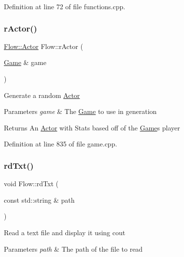 Definition at line 72 of file functions.\+cpp.

\hypertarget{namespace_flow_ad2921d35a512b47f3d231ae37f730e61}{}\label{namespace_flow_ad2921d35a512b47f3d231ae37f730e61} 
\subsubsection{\texorpdfstring{r\+Actor()}{rActor()}}
{\footnotesize\ttfamily \hyperlink{class_flow_1_1_actor}{Flow\+::\+Actor} Flow\+::r\+Actor (\begin{DoxyParamCaption}\item[{\hyperlink{class_flow_1_1_game}{Game} \&}]{game }\end{DoxyParamCaption})}

Generate a random \hyperlink{class_flow_1_1_actor}{Actor} 
\begin{DoxyParams}{Parameters}
{\em game} & The \hyperlink{class_flow_1_1_game}{Game} to use in generation \\
\hline
\end{DoxyParams}
\begin{DoxyReturn}{Returns}
An \hyperlink{class_flow_1_1_actor}{Actor} with Stats based off of the \hyperlink{class_flow_1_1_game}{Game}\textquotesingle{}s player 
\end{DoxyReturn}


Definition at line 835 of file game.\+cpp.

\hypertarget{namespace_flow_a652e3e72e118566969bd80c132bd4964}{}\label{namespace_flow_a652e3e72e118566969bd80c132bd4964} 
\subsubsection{\texorpdfstring{rd\+Txt()}{rdTxt()}\hspace{0.1cm}{\footnotesize\ttfamily [1/2]}}
{\footnotesize\ttfamily void Flow\+::rd\+Txt (\begin{DoxyParamCaption}\item[{const std\+::string \&}]{path }\end{DoxyParamCaption})}

Read a text file and display it using cout 
\begin{DoxyParams}{Parameters}
{\em path} & The path of the file to read \\
\hline
\end{DoxyParams}


